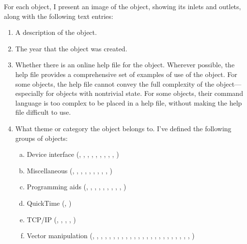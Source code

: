 For each object, I present an image of the object, showing its inlets and outlets, along with the following text entries:
\begin{enumerate}[  1)]
\item A description of the object.
\item The year that the object was created.
\item Whether there is an online help file for the object.
Wherever possible, the help file provides a comprehensive set of examples of use of the object.
For some objects, the help file cannot convey the full complexity of the object---especially for objects with nontrivial state.
For some objects, their command language is too complex to be placed in a help file, without making the help file difficult to use.
\item What theme or category the object belongs to.
I've defined the following groups of objects:
  \begin{enumerate}[a)]
  \item Device interface (, , , , , ,
    , , , )
  \item Miscellaneous (, , , , ,
    , , , , )
  \item Programming aids (, , , , ,
    , , , , )
  \item QuickTime\texttrademark{} (, )
  \item TCP/IP (, , , , )
  \item Vector manipulation (, , , , ,
    , , , , , , ,
    , , , , , ,
    , , , , , , )
  \end{enumerate}

\end{enumerate}
